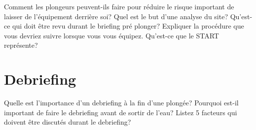 \documentclass[english,10pt,a4paper]{article}
\begin{document}
	\begin{outline}
		\1 Comment les plongeurs peuvent-ils faire pour réduire le risque important de laisser de l’équipement derrière soi?
		\1 Quel est le but d’une analyse du site?
		\1 Qu’est-ce qui doit être revu durant le briefing pré plonger?
		\1 Expliquer la procédure que vous devriez suivre lorsque vous vous équipez.
		\1 Qu’est-ce que le START représente?
	\end{outline}
	\sectionpage

	\section{Debriefing}

	\begin{outline}
		\1 Quelle est l’importance d’un debriefing à la fin d’une plongée?
		\1 Pourquoi est-il important de faire le debriefing avant de sortir de l’eau?
		\1 Listez 5 facteurs qui doivent être discutés durant le debriefing?
	\end{outline}
	\sectionpage
\end{document}

